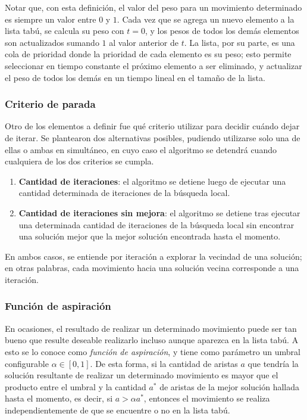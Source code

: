 Notar que, con esta definición, el valor del peso para un movimiento
determinado es siempre un valor entre $0$ y $1$. Cada vez que se agrega un
nuevo elemento a la lista tabú, se calcula su peso con $t = 0$, y los pesos de
todos los demás elementos son actualizados sumando $1$ al valor anterior de
$t$. La lista, por su parte, es una cola de prioridad donde la prioridad de
cada elemento es su peso; esto permite seleccionar en tiempo constante el
próximo elemento a ser eliminado, y actualizar el peso de todos los demás en
un tiempo lineal en el tamaño de la lista.

\subsubsection{Criterio de parada}
Otro de los elementos a definir fue qué criterio utilizar para decidir cuándo
dejar de iterar. Se plantearon dos alternativas posibles, pudiendo utilizarse
solo una de ellas o ambas en simultáneo, en cuyo caso el algoritmo se detendrá
cuando cualquiera de los dos criterios se cumpla.

\begin{enumerate}
    \item \textbf{Cantidad de iteraciones}: el algoritmo se detiene luego de
    ejecutar una cantidad determinada de iteraciones de la búsqueda local.
    \item \textbf{Cantidad de iteraciones sin mejora}: el algoritmo se detiene
    tras ejecutar una determinada cantidad de iteraciones de la búsqueda local
    sin encontrar una solución mejor que la mejor solución encontrada hasta el
    momento.
\end{enumerate}

En ambos casos, se entiende por iteración a explorar la vecindad de una
solución; en otras palabras, cada movimiento hacia una solución vecina
corresponde a una iteración.

\subsubsection{Función de aspiración}
En ocasiones, el resultado de realizar un determinado movimiento puede ser tan
bueno que resulte deseable realizarlo incluso aunque aparezca en la lista
tabú. A esto se lo conoce como \emph{función de aspiración}, y tiene como
parámetro un umbral configurable $\alpha \in [0, 1]$. De esta forma, si la
cantidad de aristas $a$ que tendría la solución resultante de realizar un
determinado movimiento es mayor que el producto entre el umbral y la cantidad
$a^*$ de aristas de la mejor solución hallada hasta el momento, es decir, si
$a > \alpha a^*$, entonces el movimiento se realiza independientemente de que
se encuentre o no en la lista tabú.

